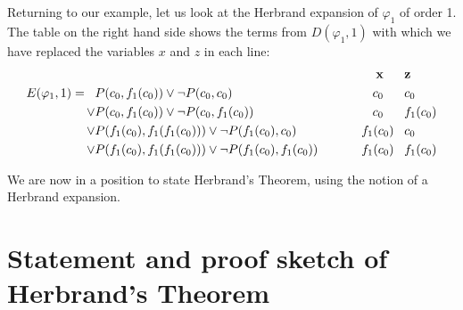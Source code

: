 \documentclass[a4paper,12pt]{report}
\theoremstyle{definition}
\begin{document}
Returning to our example, let us look at the Herbrand expansion of $\varphi_1$ of order 1. The table on the right hand side shows the terms from $D(\varphi_1, 1)$ with which we have replaced the variables $x$ and $z$ in each line:
\begin{align}
& &\mathbf{x} \; \; \; \; \; \; &\mathbf{z} \notag \\
E(\varphi_1, 1) = \; \; \; &P(c_0, f_1(c_0)) \lor \neg P(c_0, c_0) \; \; \; \; &c_0 \; \; \; \; \; \; &c_0 \notag\\
\lor &P(c_0, f_1(c_0)) \lor \neg P(c_0, f_1(c_0)) &c_0 \; \; \; \; \; \; &f_1(c_0) \notag\\
\lor &P(f_1(c_0), f_1(f_1(c_0))) \lor \neg P(f_1(c_0), c_0) &f_1(c_0) \; \; \; &c_0 \notag\\
\lor &P(f_1(c_0), f_1(f_1(c_0))) \lor \neg P(f_1(c_0), f_1(c_0)) \; \; \; \; \; \; \; \; \; &f_1(c_0) \; \; \; &f_1(c_0) \notag
\end{align}

We are now in a position to state Herbrand's Theorem, using the notion of a Herbrand expansion.

\section{Statement and proof sketch of Herbrand's Theorem}
\label{sec: sketch}
\end{document}
